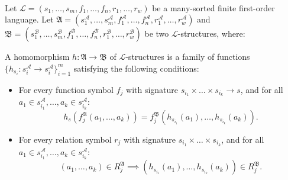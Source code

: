 \begin{definition}\ \\
    Let \( \mathcal{L} \mathop{=} (s_1, \dots, s_m, f_1, \dots, f_n, r_1, \dots, r_w) \) be a many-sorted finite first-order language.  
    Let \( \mathfrak{A} \mathop{=} (s_1^\mathcal{A}, \dots, s_m^\mathcal{A}, f_1^\mathcal{A}, \dots, f_n^\mathcal{A}, r_1^\mathcal{A}, \dots, r_w^\mathcal{A}) \) and \( \mathfrak{B} \mathop{=}  (s_1^\mathcal{B}, \dots, s_m^\mathcal{B}, f_1^\mathcal{B}, \dots, f_n^\mathcal{B}, r_1^\mathcal{B}, \dots, r_w^\mathcal{B}) \) be two \( \mathcal{L} \)-structures, where:

A homomorphism \( h: \mathfrak{A} \mathop{\to} \mathfrak{B} \) of $\mathcal{L}$-structures is a family of functions \( \{h_{s_i} : s_i^\mathcal{A} \mathop{\to} s_i^\mathcal{A}\}_{i=1}^m \) satisfying the following conditions:
\begin{itemize}
    \item For every function symbol \( f_j \) with signature \( s_{i_1} \mathop{\times} \dots \mathop{\times} s_{i_k} \mathop{\to} s \), and for all \( a_1 \mathop{\in} s_{i_1}^\mathcal{A}, \dots, a_k \mathop{\in} s_{i_k}^\mathcal{A} \):  
    \[
    h_s\left(f_j^\mathfrak{A}(a_1, \dots, a_k)\right) \mathop{=} f_j^\mathfrak{B}\left(h_{s_{i_1}}(a_1), \dots, h_{s_{i_k}}(a_k)\right).
    \]
    \item For every relation symbol \( r_j \) with signature \( s_{i_1} \mathop{\times} \dots \mathop{\times} s_{i_k} \), and for all \( a_1 \mathop{\in} s_{i_1}^\mathcal{A}, \dots, a_k \mathop{\in} s_{i_k}^\mathcal{A} \):  
    \[
    (a_1, \dots, a_k) \mathop{\in} R_j^\mathfrak{A} \implies \left(h_{s_{i_1}}(a_1),  \dots, h_{s_{i_k}}(a_k)\right) \mathop{\in} R_j^\mathfrak{B}.
    \]
\end{itemize}
\end{definition}



